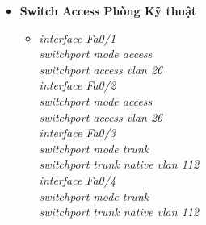 \documentclass[12pt,a4paper]{report}
\begin{document}
\begin{itemize}
\begin{itemize}
\begin{itemize}
    \end{itemize}
     \item \textbf{Switch Access Phòng Kỹ thuật}
     \begin{itemize}
      \item \textit{interface Fa0/1\\
\hspace*{2cm}switchport mode access\\
\hspace*{2cm}switchport access vlan 26\\
\hspace*{2cm}interface Fa0/2\\
\hspace*{2cm}switchport mode access\\
\hspace*{2cm}switchport access vlan 26\\
\hspace*{2cm}interface Fa0/3\\
\hspace*{2cm}switchport mode trunk\\
\hspace*{2cm}switchport trunk native vlan 112\\
\hspace*{2cm}interface Fa0/4\\
\hspace*{2cm}switchport mode trunk\\
\hspace*{2cm}switchport trunk native vlan 112\\}
     
    \end{itemize}

   \end{itemize}
\end{itemize}
\end{document}
